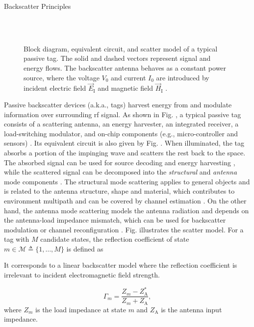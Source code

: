 \documentclass[journal]{IEEEtran}
\begin{document}
\begin{section}{Backscatter Principles}
	\begin{figure}[!t]
		\centering
		\\
		\\
		\caption{Block diagram, equivalent circuit, and scatter model of a typical passive tag. The solid and dashed vectors represent signal and energy flows. The backscatter antenna behaves as a constant power source, where the voltage $V_0$ and current $I_0$ are introduced by incident electric field $\vec{E}_{\mathrm{I}}$ and magnetic field $\vec{H}_{\mathrm{I}}$ \cite{Huang2021}.}
	\end{figure}
	Passive backscatter devices (a.k.a., tags) harvest energy from and modulate information over surrounding \gls{rf} signal.
	As shown in Fig. , a typical passive tag consists of a scattering antenna, an energy harvester, an integrated receiver, a load-switching modulator, and on-chip components (e.g., micro-controller and sensors) \cite{Dobkin2012}. Its equivalent circuit is also given by Fig. .
	When illuminated, the tag absorbs a portion of the impinging wave and scatters the rest back to the space.
	The absorbed signal can be used for source decoding and energy harvesting \cite{Kim2021a}, while the scattered signal can be decomposed into the \emph{structural} and \emph{antenna} mode components \cite{Hansen1989}.
	The structural mode scattering applies to general objects and is related to the antenna structure, shape and material, which contributes to environment multipath and can be covered by channel estimation \cite{Boyer2014}.
	On the other hand, the antenna mode scattering models the antenna radiation and depends on the antenna-load impedance mismatch, which can be used for backscatter modulation \cite{Boyer2012} or channel reconfiguration \cite{Wu2021b}.
	Fig.  illustrates the scatter model.
	For a tag with $M$ candidate states, the reflection coefficient of state $m \in \mathcal{M} \triangleq \{1,\ldots,M\}$ is defined as
	\begin{footnote}
		It corresponds to a linear backscatter model where the reflection coefficient is irrelevant to incident electromagnetic field strength.
	\end{footnote}
	\begin{equation}
		\Gamma_m = \frac{Z_m - Z_{\mathrm{A}}^*}{Z_m + Z_{\mathrm{A}}},
		\label{eq:reflection_coefficient}
	\end{equation}
	where $Z_m$ is the load impedance at state $m$ and $Z_{\mathrm{A}}$ is the antenna input impedance.


\end{section}
\end{document}
